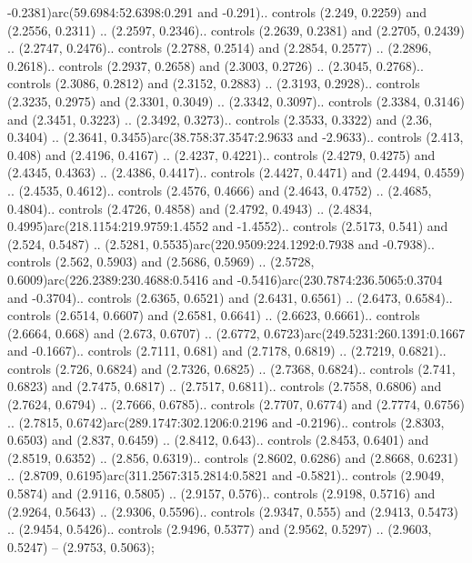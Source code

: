 -0.2381)arc(59.6984:52.6398:0.291 and -0.291).. controls (2.249, 0.2259) and (2.2556, 0.2311) .. (2.2597, 0.2346).. controls (2.2639, 0.2381) and (2.2705, 0.2439) .. (2.2747, 0.2476).. controls (2.2788, 0.2514) and (2.2854, 0.2577) .. (2.2896, 0.2618).. controls (2.2937, 0.2658) and (2.3003, 0.2726) .. (2.3045, 0.2768).. controls (2.3086, 0.2812) and (2.3152, 0.2883) .. (2.3193, 0.2928).. controls (2.3235, 0.2975) and (2.3301, 0.3049) .. (2.3342, 0.3097).. controls (2.3384, 0.3146) and (2.3451, 0.3223) .. (2.3492, 0.3273).. controls (2.3533, 0.3322) and (2.36, 0.3404) .. (2.3641, 0.3455)arc(38.758:37.3547:2.9633 and -2.9633).. controls (2.413, 0.408) and (2.4196, 0.4167) .. (2.4237, 0.4221).. controls (2.4279, 0.4275) and (2.4345, 0.4363) .. (2.4386, 0.4417).. controls (2.4427, 0.4471) and (2.4494, 0.4559) .. (2.4535, 0.4612).. controls (2.4576, 0.4666) and (2.4643, 0.4752) .. (2.4685, 0.4804).. controls (2.4726, 0.4858) and (2.4792, 0.4943) .. (2.4834, 0.4995)arc(218.1154:219.9759:1.4552 and -1.4552).. controls (2.5173, 0.541) and (2.524, 0.5487) .. (2.5281, 0.5535)arc(220.9509:224.1292:0.7938 and -0.7938).. controls (2.562, 0.5903) and (2.5686, 0.5969) .. (2.5728, 0.6009)arc(226.2389:230.4688:0.5416 and -0.5416)arc(230.7874:236.5065:0.3704 and -0.3704).. controls (2.6365, 0.6521) and (2.6431, 0.6561) .. (2.6473, 0.6584).. controls (2.6514, 0.6607) and (2.6581, 0.6641) .. (2.6623, 0.6661).. controls (2.6664, 0.668) and (2.673, 0.6707) .. (2.6772, 0.6723)arc(249.5231:260.1391:0.1667 and -0.1667).. controls (2.7111, 0.681) and (2.7178, 0.6819) .. (2.7219, 0.6821).. controls (2.726, 0.6824) and (2.7326, 0.6825) .. (2.7368, 0.6824).. controls (2.741, 0.6823) and (2.7475, 0.6817) .. (2.7517, 0.6811).. controls (2.7558, 0.6806) and (2.7624, 0.6794) .. (2.7666, 0.6785).. controls (2.7707, 0.6774) and (2.7774, 0.6756) .. (2.7815, 0.6742)arc(289.1747:302.1206:0.2196 and -0.2196).. controls (2.8303, 0.6503) and (2.837, 0.6459) .. (2.8412, 0.643).. controls (2.8453, 0.6401) and (2.8519, 0.6352) .. (2.856, 0.6319).. controls (2.8602, 0.6286) and (2.8668, 0.6231) .. (2.8709, 0.6195)arc(311.2567:315.2814:0.5821 and -0.5821).. controls (2.9049, 0.5874) and (2.9116, 0.5805) .. (2.9157, 0.576).. controls (2.9198, 0.5716) and (2.9264, 0.5643) .. (2.9306, 0.5596).. controls (2.9347, 0.555) and (2.9413, 0.5473) .. (2.9454, 0.5426).. controls (2.9496, 0.5377) and (2.9562, 0.5297) .. (2.9603, 0.5247) -- (2.9753, 0.5063);



